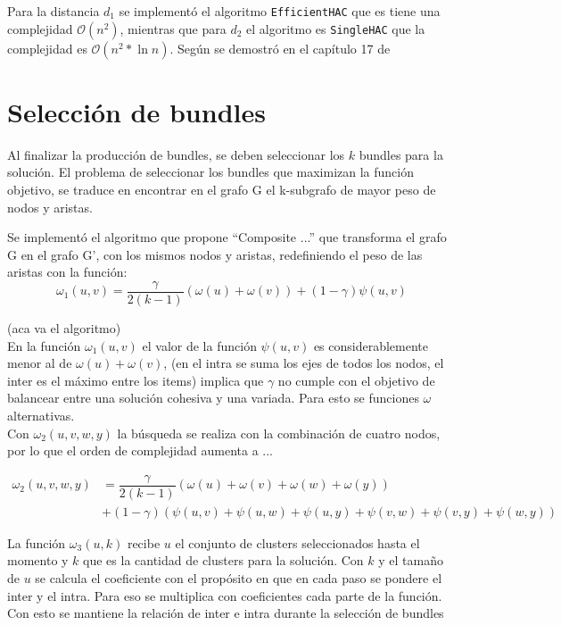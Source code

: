 Para la distancia $d_{1}$ se implementó el algoritmo \texttt{EfficientHAC} que es tiene una 
complejidad $\mathcal{O}(n^{2})$, mientras que para $d_{2}$ el algoritmo es \texttt{SingleHAC} que 
la complejidad es $\mathcal{O}(n^{2} * \ln{n})$. Según se demostró en el capítulo 17 de 
\cite{informationRetrival}


\section{Selección de bundles}
Al finalizar la producción de bundles, se deben seleccionar los $k$ bundles para la solución.
El problema de seleccionar los bundles que maximizan la función objetivo, se traduce en 
encontrar en el grafo G el k-subgrafo de mayor peso de nodos y aristas.

Se implementó el algoritmo que propone ``Composite ...''\cite{compositeRetrival} que transforma el 
grafo G en el grafo G', con los mismos nodos y aristas, redefiniendo el peso de las aristas con la 
función:\\

\begin{equation}
\omega_{1}(u,v) = \dfrac{\gamma}{2( k - 1)} (\omega(u) + \omega(v)) + (1 - \gamma)\psi(u,v) 
\end{equation}

(aca va el algoritmo)\\

En la función $\omega_{1}(u,v)$ el valor de la función $\psi(u,v)$  es considerablemente menor al de
$\omega(u) + \omega(v)$, (en el intra se suma los ejes de todos los nodos, el inter es el máximo entre los items)
implica que $\gamma$ no cumple con el objetivo de balancear entre una solución cohesiva y una variada.
Para esto se funciones $\omega$ alternativas.\\

Con $\omega_{2}(u,v,w,y)$ la búsqueda se realiza con la combinación de cuatro nodos, por lo que el orden de complejidad
aumenta a ...

\begin{equation}
\begin{split}
\omega_{2}(u,v,w,y) &= \dfrac{\gamma}{2( k - 1)} (\omega(u) + \omega(v) + \omega(w) + \omega(y)) \\
&+ (1 - \gamma)(\psi(u,v) + \psi(u,w) + \psi(u,y)  + \psi(v,w) + \psi(v,y) + \psi(w,y))
\end{split}
\end{equation}

La función $\omega_{3}(u, k)$ recibe $u$ el conjunto de clusters seleccionados hasta el momento 
y $k$ que es la cantidad de clusters para la solución. Con $k$ y el tamaño de $u$ se calcula el 
coeficiente con el propósito en que en cada paso se pondere el inter y el intra. Para eso se multiplica
con coeficientes cada parte de la función. Con esto se mantiene la relación de inter e intra durante la selección de bundles

